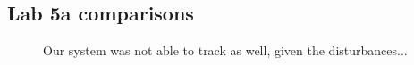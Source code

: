 \documentclass[11pt]{article}
\begin{document}
\newpage \clearpage

\subsection{Lab 5a comparisons}
\begin{figure}[ht]
    \centering

    \caption{Our system was not able to track as well, given the disturbances...}
\end{figure}
\end{document}
